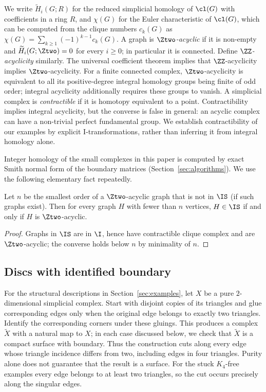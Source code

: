 We write $\widetilde H_i(G;R)$ for the reduced simplicial homology of $\cl(G)$ with coefficients in a ring $R$, and $\chi(G)$ for the Euler characteristic of $\cl(G)$, which can be computed from the clique numbers $c_k(G)$ as $\chi(G)=\sum_{k\ge1}(-1)^{k-1}c_k(G)$. A graph is \emph{$\Ztwo$-acyclic} if it is non-empty and $\widetilde H_i(G;\Ztwo)=0$ for every $i\ge0$; in particular it is connected. Define \emph{$\ZZ$-acyclicity} similarly. The universal coefficient theorem implies that $\ZZ$-acyclicity implies $\Ztwo$-acyclicity. For a finite connected complex, $\Ztwo$-acyclicity is equivalent to all its positive-degree integral homology groups being finite of odd order; integral acyclicity additionally requires these groups to vanish. A simplicial complex is \emph{contractible} if it is homotopy equivalent to a point. Contractibility implies integral acyclicity, but the converse is false in general: an acyclic complex can have a non-trivial perfect fundamental group. We establish contractibility of our examples by explicit I-transformations, rather than inferring it from integral homology alone.


Integer homology of the small complexes in this paper is computed by exact Smith normal form of the boundary matrices (Section~\ref{sec:algorithms}). We use the following elementary fact repeatedly.

\begin{lemma}\label{lem:acyclic-IS}
Let $n$ be the smallest order of a $\Ztwo$-acyclic graph that is not in $\IS$ (if such graphs exist). Then for every graph $H$ with fewer than $n$ vertices, $H\in\IS$ if and only if $H$ is $\Ztwo$-acyclic.
\end{lemma}
\begin{proof}
Graphs in $\IS$ are in $\I$, hence have contractible clique complex and are $\Ztwo$-acyclic; the converse holds below $n$ by minimality of $n$.
\end{proof}

\subsection{Discs with identified boundary}

For the structural descriptions in Section~\ref{sec:examples}, let $X$ be a pure $2$-dimensional simplicial complex. Start with disjoint copies of its triangles and glue corresponding edges only when the original edge belongs to exactly two triangles. Identify the corresponding corners under these gluings. This produces a complex $\widetilde X$ with a natural map to $X$; in each case discussed below, we check that $\widetilde X$ is a compact surface with boundary. Thus the construction cuts along every edge whose triangle incidence differs from two, including edges in four triangles. Purity alone does not guarantee that the result is a surface. For the stuck $K_4$-free examples every edge belongs to at least two triangles, so the cut occurs precisely along the singular edges.

